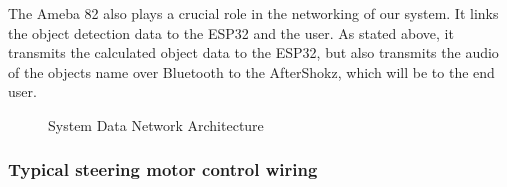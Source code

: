 \noindent The Ameba 82 also plays a crucial role in the networking of our system. It links the object detection data to the ESP32 and the user. As stated above, it transmits the calculated object data to the ESP32, but also transmits the audio of the objects name over Bluetooth to the AfterShokz, which will be to the end user. \\

\begin{figure}[H]
	\centering
	\caption{\label{fig:System_Network_Arch}System Data Network Architecture}
\end{figure}


\subsubsection{Typical steering motor control wiring}

